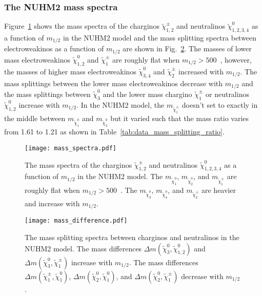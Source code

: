 \subsubsection{The NUHM2 mass spectra}
\label{subsubsec:data_NUHM2_mass_spectra}
Figure~\ref{fig:data_mass_spectra} shows the mass spectra of the charginos $\widetilde{\chi}^{\pm}_{1,2}$ and neutralinos $\widetilde{\chi}^{0}_{1,2,3,4}$ as a function of $m_{1/2}$ in the NUHM2 model and the mass splitting spectra between electroweakinos as a function of $m_{1/2}$ are shown in Fig.~\ref{fig:data_mass_splitting_spectra}.
The masses of lower mass electroweakinos $\widetilde{\chi}^{0}_{1,2}$ and $\widetilde{\chi}^{\pm}_{1}$ are roughly flat when $m_{1/2} > 500$~{\GeV}, however, the masses of higher mass electroweakinos $\widetilde{\chi}^{0}_{3,4}$ and $\widetilde{\chi}^{\pm}_{2}$ increased with $m_{1/2}$.
The mass splittings between the lower mass electroweakinos decrease with $m_{1/2}$ and the mass splittings between $\widetilde{\chi}^{0}_{3}$ and the lower mass chargino $\widetilde{\chi}^{\pm}_{1}$ or neutralinos $\widetilde{\chi}^{0}_{1,2}$ increase with $m_{1/2}$.
In the NUHM2 model, the $m_{\widetilde{\chi}^{\pm}_{1}}$ doesn't set to exactly in the middle between $m_{\widetilde{\chi}^{0}_{1}}$ and $m_{\widetilde{\chi}^{0}_{2}}$ but it varied such that the mass ratio varies from 1.61 to 1.21 as shown in Table~\ref{tab:data_mass_splitting_ratio}.

\begin{figure}[htbp]
    \begin{center}
        \texttt{[image: mass\_spectra.pdf]}
        \caption{The mass spectra of the charginos $\widetilde{\chi}^{\pm}_{1,2}$ and neutralinos $\widetilde{\chi}^{0}_{1,2,3,4}$ as a function of $m_{1/2}$ in the NUHM2 model.
        The $m_{\widetilde{\chi}^{0}_{1}}$, $m_{\widetilde{\chi}^{0}_{2}}$, and $m_{\widetilde{\chi}^{\pm}_{1}}$ are roughly flat when $m_{1/2} > 500$~{\GeV}.
        The $m_{\widetilde{\chi}^{0}_{3}}$, $m_{\widetilde{\chi}^{0}_{4}}$, and $m_{\widetilde{\chi}^{\pm}_{2}}$ are heavier and increase with $m_{1/2}$.}
        \label{fig:data_mass_spectra}
    \end{center}
\end{figure}

\begin{figure}[htbp]
    \begin{center}
        \texttt{[image: mass\_difference.pdf]}
        \caption{The mass splitting spectra between charginos and neutralinos in the NUHM2 model.
        The mass differences $\Delta m(\widetilde{\chi}^{0}_{3}, \widetilde{\chi}^{0}_{1,2})$ and $\Delta m(\widetilde{\chi}^{0}_{3}, \widetilde{\chi}^{\pm}_{1})$ increase with $m_{1/2}$.
        The mass differences $\Delta m(\widetilde{\chi}^{\pm}_{1}, \widetilde{\chi}^{0}_{1})$, $\Delta m(\widetilde{\chi}^{0}_{2}, \widetilde{\chi}^{0}_{1})$, and $\Delta m(\widetilde{\chi}^{0}_{2}, \widetilde{\chi}^{\pm}_{1})$ decrease with $m_{1/2}$.}
        \label{fig:data_mass_splitting_spectra}
    \end{center}
\end{figure}


